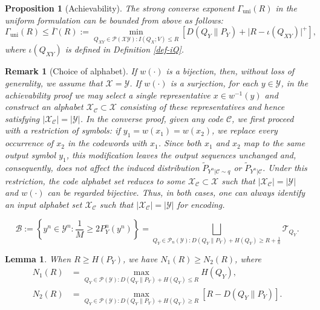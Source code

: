 \documentclass[10pt,a4paper]{amsart}
\newtheorem{proposition}{Proposition}
\newtheorem{remark}{Remark}
\newtheorem{lemma}{Lemma}
\newcommand{\Ga}{\mathit{\Gamma}}
\newcommand{\Gu}{\overline{\Ga}}
\newcommand{\iQ}{\iota(Q_{XY})}
\newcommand{\mB}{\mathcal{B}}
\newcommand{\mC}{\mathcal{C}}
\newcommand{\mP}{\mathcal{P}}
\newcommand{\mT}{\mathcal{T}}
\newcommand{\mX}{\mathcal{X}}
\newcommand{\mY}{\mathcal{Y}}
\newcommand{\su}{\mathrm{uni}}
\newcommand{\tP}{\tilde{P}}
\newcommand{\tPy}{\tP_{Y^n|\mC}}
\newcommand{\tPyQ}{\tP_{Y^n|\mC\sim q}}
\begin{document}
\begin{proposition}[Achievability]\label{prop-sc-achi} The strong converse exponent  $\Ga_\su(R)$ in the uniform formulation can be bounded from above as follows:
    $$ \Ga_\su(R) \leq \Gu(R) := \min_{Q_{XY}\in\mP(\mX\mY): I(Q_X;V) \leq R} \left[D(Q_Y\|P_Y) + \big| R - \iQ \big|^+ \right], $$ 
    where $\iQ$ is defined in Definition \ref{def-iQ}.
\end{proposition}

\begin{remark}[Choice of alphabet]\label{rmk-chooseX} 
 If $w(\cdot)$ is a bijection, then, without loss of generality, we assume that  $\mX=\mY$.
     If $w(\cdot)$ is a surjection, for each $y\in\mY$, in the achievability proof we may select a single representative $x\in w^{-1}(y)$ and construct an alphabet $\mX_\mC \subset\mX$ consisting of these representatives and hence satisfying $|\mX_\mC| = |\mY|$. In the converse proof, given any code $\mC$, we first proceed with a restriction of symbols: if $y_1 = w(x_1) = w(x_2)$, we replace every occurrence of $x_2$ in the codewords with $x_1$. Since both $x_1$ and $x_2$ map to the same output symbol $y_1$, this modification leaves the output sequences unchanged and, consequently, does not affect the induced distribution $\tPyQ$ or $\tPy$. Under this restriction, the code alphabet set reduces to some $\mX_\mC \subset\mX$ such that $|\mX_\mC|=|\mY|$ and $w(\cdot)$ can be regarded bijective. 
Thus, in both cases, one can always identify an input alphabet set $\mX_\mC$ such that $|\mX_\mC|= |\mY|$ for encoding. 
\end{remark}

\begin{equation}\label{badset}
    \mB:= \left\{y^n\in\mY^n: \frac{1}{M} \geq 2 P_Y^n(y^n) \right\} 
    = \bigsqcup_{Q_Y\in\mP_n(\mY): D(Q_Y\|P_Y) + H(Q_Y) \geq R + \frac1n} \mT_{Q_Y}.
\end{equation}

\begin{lemma}\label{lem-N1N2}
    When $R\geq H(P_Y)$, we have $N_1(R) \geq N_2(R)$,  where
    \begin{align*}
        N_1(R) &= \max_{Q_Y\in\mP(\mY): D(Q_Y\|P_Y) + H(Q_Y)\leq R} H(Q_Y), \\
        N_2(R) &= \max_{Q_Y\in\mP(\mY): D(Q_Y\|P_Y) + H(Q_Y)\geq R} \left[R-D(Q_Y\|P_Y)\right].
    \end{align*}
\end{lemma}
\end{document}
